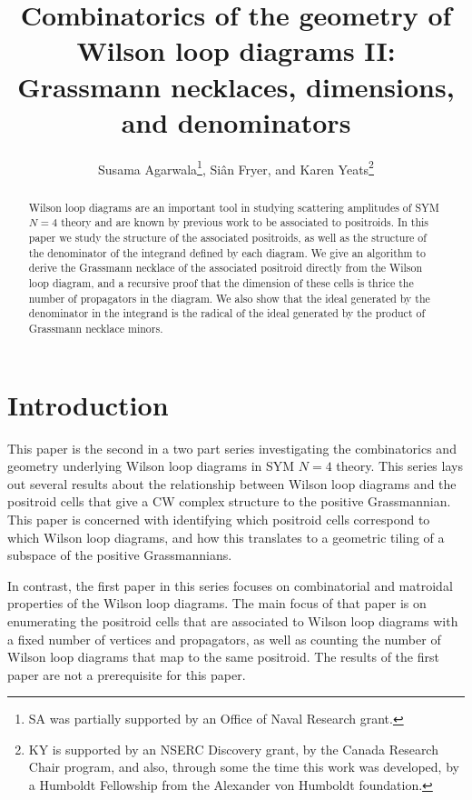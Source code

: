 \documentclass[11pt]{article}
\title{Combinatorics of the geometry of Wilson loop diagrams II: Grassmann necklaces, dimensions, and denominators}
\author{Susama Agarwala\thanks{SA was partially supported by an Office of Naval Research grant.}, Si\^an Fryer, and Karen Yeats\thanks{KY is supported by an NSERC Discovery grant, by the Canada Research Chair program, and also, through some the time this work was developed, by a Humboldt Fellowship from the Alexander von Humboldt foundation.}}
\date{}
\theoremstyle{remark}
\theoremstyle{definition}
\begin{document}
\maketitle

\begin{abstract}
  Wilson loop diagrams are an important tool in studying scattering amplitudes of SYM $N=4$ theory and are known by previous work to be associated to positroids. In this paper we study the structure of the associated positroids, as well as the structure of the denominator of the integrand defined by each diagram. We give an algorithm to derive the Grassmann necklace of the associated positroid directly from the Wilson loop diagram, and a recursive proof that the dimension of these cells is thrice the number of propagators in the diagram. We also show that the ideal generated by the denominator in the integrand is the radical of the ideal generated by the product of Grassmann necklace minors.
\end{abstract}
\section{Introduction}


This paper is the second in a two part series investigating the combinatorics and geometry underlying Wilson loop diagrams in SYM $N=4$ theory. This series lays out several results about the relationship between Wilson loop diagrams and the positroid cells that give a CW complex structure to the positive Grassmannian. This paper is concerned with identifying which positroid cells correspond to which Wilson loop diagrams, and how this translates to a geometric tiling of a subspace of the positive Grassmannians. 



In contrast, the first paper in this series focuses on combinatorial and matroidal properties of the Wilson loop diagrams. The main focus of that paper is on enumerating the positroid cells that are associated to Wilson loop diagrams with a fixed number of vertices and propagators, as well as counting the number of Wilson loop diagrams that map to the same positroid. The results of the first paper are not a prerequisite for this paper.
\end{document}
